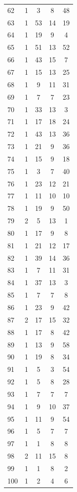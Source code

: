 \documentclass[12pt,a4paper]{report}
\begin{document}
\begin{appendices}
\begin{longtable}{lcccc}
62  &   1 &   3 &   8 &  48 \\
63  &   1 &  53 &  14 &  19 \\
64  &   1 &  19 &   9 &   4 \\
65  &   1 &  51 &  13 &  52 \\
66  &   1 &  43 &  15 &   7 \\
67  &   1 &  15 &  13 &  25 \\
68  &   1 &   9 &  11 &  31 \\
69  &   1 &   7 &   7 &  23 \\
70  &   1 &  33 &  13 &   3 \\
71  &   1 &  17 &  18 &  24 \\
72  &   1 &  43 &  13 &  36 \\
73  &   1 &  21 &   9 &  36 \\
74  &   1 &  15 &   9 &  18 \\
75  &   1 &   3 &   7 &  40 \\
76  &   1 &  23 &  12 &  21 \\
77  &   1 &  11 &  10 &  10 \\
78  &   1 &  19 &   9 &  50 \\
79  &   2 &   5 &  13 &   1 \\
80  &   1 &  17 &   9 &   8 \\
81  &   1 &  21 &  12 &  17 \\
82  &   1 &  39 &  14 &  36 \\
83  &   1 &   7 &  11 &  31 \\
84  &   1 &  37 &  13 &   3 \\
85  &   1 &   7 &   7 &   8 \\
86  &   1 &  23 &   9 &  42 \\
87  &   2 &  17 &  15 &  32 \\
88  &   1 &  17 &   8 &  42 \\
89  &   1 &  13 &   9 &  58 \\
90  &   1 &  19 &   8 &  34 \\
91  &   1 &   5 &   3 &  54 \\
92  &   1 &   5 &   8 &  28 \\
93  &   1 &   7 &   7 &   7 \\
94  &   1 &   9 &  10 &  37 \\
95  &   1 &  11 &   9 &  54 \\
96  &   1 &   5 &   7 &   7 \\
97  &   1 &   1 &   8 &   8 \\
98  &   2 &  11 &  15 &   8 \\
99  &   1 &   1 &   8 &   2 \\
100 &   1 &   2 &   4 &   6 \\
\bottomrule
\end{longtable}


\end{appendices}
\end{document}

